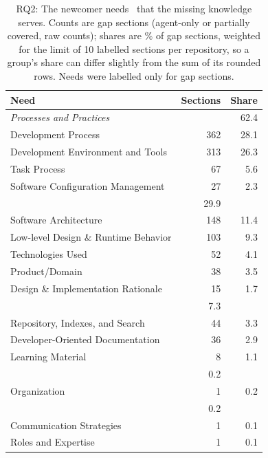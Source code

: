 \begin{table}[t]
\caption{RQ2: The newcomer needs~\cite{dagenais2010landscape} that the missing knowledge serves. Counts are gap sections (agent-only or partially covered, raw counts); shares are \% of gap sections, weighted for the limit of 10 labelled sections per repository, so a group's share can differ slightly from the sum of its rounded rows. Needs were labelled only for gap sections.}
\label{tab:rq2needs}
\small
\begin{tabular}{lrr}
\toprule
Need & Sections & Share \\
\midrule
\multicolumn{2}{l}{\emph{Processes and Practices}} & 62.4 \\
\quad Development Process & 362 & 28.1 \\
\quad Development Environment and Tools & 313 & 26.3 \\
\quad Task Process & 67 & 5.6 \\
\quad Software Configuration Management & 27 & 2.3 \\
\addlinespace
\multicolumn{2}{l}{\emph{Product}} & 29.9 \\
\quad Software Architecture & 148 & 11.4 \\
\quad Low-level Design \& Runtime Behavior & 103 & 9.3 \\
\quad Technologies Used & 52 & 4.1 \\
\quad Product/Domain & 38 & 3.5 \\
\quad Design \& Implementation Rationale & 15 & 1.7 \\
\addlinespace
\multicolumn{2}{l}{\emph{Documentation}} & 7.3 \\
\quad Repository, Indexes, and Search & 44 & 3.3 \\
\quad Developer-Oriented Documentation & 36 & 2.9 \\
\quad Learning Material & 8 & 1.1 \\
\addlinespace
\multicolumn{2}{l}{\emph{Context}} & 0.2 \\
\quad Organization & 1 & 0.2 \\
\addlinespace
\multicolumn{2}{l}{\emph{Team}} & 0.2 \\
\quad Communication Strategies & 1 & 0.1 \\
\quad Roles and Expertise & 1 & 0.1 \\
\bottomrule
\end{tabular}
\end{table}
